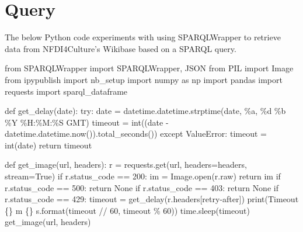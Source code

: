 \documentclass[
  letterpaper,
  DIV=11,
  numbers=noendperiod]{scrreprt}
\newenvironment{Shaded}{\begin{snugshade}}{\end{snugshade}}
\newcommand{\BuiltInTok}[1]{\textcolor[rgb]{0.00,0.23,0.31}{#1}}
\newcommand{\ControlFlowTok}[1]{\textcolor[rgb]{0.00,0.23,0.31}{#1}}
\newcommand{\DecValTok}[1]{\textcolor[rgb]{0.68,0.00,0.00}{#1}}
\newcommand{\ImportTok}[1]{\textcolor[rgb]{0.00,0.46,0.62}{#1}}
\newcommand{\KeywordTok}[1]{\textcolor[rgb]{0.00,0.23,0.31}{#1}}
\newcommand{\NormalTok}[1]{\textcolor[rgb]{0.00,0.23,0.31}{#1}}
\newcommand{\OperatorTok}[1]{\textcolor[rgb]{0.37,0.37,0.37}{#1}}
\newcommand{\PreprocessorTok}[1]{\textcolor[rgb]{0.68,0.00,0.00}{#1}}
\newcommand{\SpecialCharTok}[1]{\textcolor[rgb]{0.37,0.37,0.37}{#1}}
\newcommand{\StringTok}[1]{\textcolor[rgb]{0.13,0.47,0.30}{#1}}
\newcommand{\VariableTok}[1]{\textcolor[rgb]{0.07,0.07,0.07}{#1}}
\begin{document}
\hypertarget{query}{%
\section{Query}\label{query}}

The below Python code experiments with using SPARQLWrapper to retrieve
data from NFDI4Culture's Wikibase based on a SPARQL query.

\begin{Shaded}
\begin{Highlighting}[]
\ImportTok{from}\NormalTok{ SPARQLWrapper }\ImportTok{import}\NormalTok{ SPARQLWrapper, JSON}
\ImportTok{from}\NormalTok{ PIL }\ImportTok{import}\NormalTok{ Image}
\ImportTok{from}\NormalTok{ ipypublish }\ImportTok{import}\NormalTok{ nb\_setup}
\ImportTok{import}\NormalTok{ numpy }\ImportTok{as}\NormalTok{ np}
\ImportTok{import}\NormalTok{ pandas}
\ImportTok{import}\NormalTok{ requests}
\ImportTok{import}\NormalTok{ sparql\_dataframe}

\KeywordTok{def}\NormalTok{ get\_delay(date):}
    \ControlFlowTok{try}\NormalTok{:}
\NormalTok{        date }\OperatorTok{=}\NormalTok{ datetime.datetime.strptime(date, }\StringTok{\textquotesingle{}\%a, }\SpecialCharTok{\%d}\StringTok{ \%b \%Y \%H:\%M:\%S GMT\textquotesingle{}}\NormalTok{)}
\NormalTok{        timeout }\OperatorTok{=} \BuiltInTok{int}\NormalTok{((date }\OperatorTok{{-}}\NormalTok{ datetime.datetime.now()).total\_seconds())}
    \ControlFlowTok{except} \PreprocessorTok{ValueError}\NormalTok{:}
\NormalTok{        timeout }\OperatorTok{=} \BuiltInTok{int}\NormalTok{(date)}
    \ControlFlowTok{return}\NormalTok{ timeout}

\KeywordTok{def}\NormalTok{ get\_image(url, headers):}
\NormalTok{    r }\OperatorTok{=}\NormalTok{ requests.get(url, headers}\OperatorTok{=}\NormalTok{headers, stream}\OperatorTok{=}\VariableTok{True}\NormalTok{)}
    \ControlFlowTok{if}\NormalTok{ r.status\_code }\OperatorTok{==} \DecValTok{200}\NormalTok{:}
\NormalTok{        im }\OperatorTok{=}\NormalTok{ Image.}\BuiltInTok{open}\NormalTok{(r.raw)}
        \ControlFlowTok{return}\NormalTok{ im}
    \ControlFlowTok{if}\NormalTok{ r.status\_code }\OperatorTok{==} \DecValTok{500}\NormalTok{:}
        \ControlFlowTok{return} \VariableTok{None}
    \ControlFlowTok{if}\NormalTok{ r.status\_code }\OperatorTok{==} \DecValTok{403}\NormalTok{:}
        \ControlFlowTok{return} \VariableTok{None}
    \ControlFlowTok{if}\NormalTok{ r.status\_code }\OperatorTok{==} \DecValTok{429}\NormalTok{:}
\NormalTok{        timeout }\OperatorTok{=}\NormalTok{ get\_delay(r.headers[}\StringTok{\textquotesingle{}retry{-}after\textquotesingle{}}\NormalTok{])}
        \BuiltInTok{print}\NormalTok{(}\StringTok{\textquotesingle{}Timeout }\SpecialCharTok{\{\}}\StringTok{ m }\SpecialCharTok{\{\}}\StringTok{ s\textquotesingle{}}\NormalTok{.}\BuiltInTok{format}\NormalTok{(timeout }\OperatorTok{//} \DecValTok{60}\NormalTok{, timeout }\OperatorTok{\%} \DecValTok{60}\NormalTok{))}
\NormalTok{        time.sleep(timeout)}
\NormalTok{        get\_image(url, headers)}


\end{Highlighting}
\end{Shaded}
\end{document}

